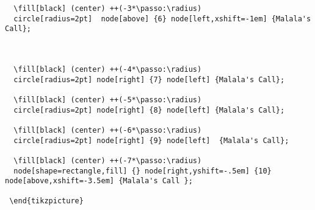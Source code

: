\begin{verbatim}
  \fill[black] (center) ++(-3*\passo:\radius)
  circle[radius=2pt]  node[above] {6} node[left,xshift=-1em] {Malala's Call};



  \fill[black] (center) ++(-4*\passo:\radius)
  circle[radius=2pt] node[right] {7} node[left] {Malala's Call};

  \fill[black] (center) ++(-5*\passo:\radius)
  circle[radius=2pt] node[right] {8} node[left] {Malala's Call};

  \fill[black] (center) ++(-6*\passo:\radius)
  circle[radius=2pt] node[right] {9} node[left]  {Malala's Call};

  \fill[black] (center) ++(-7*\passo:\radius)
  node[shape=rectangle,fill] {} node[right,yshift=-.5em] {10}  node[above,xshift=-3.5em] {Malala's Call };

 \end{tikzpicture}
\end{verbatim}


